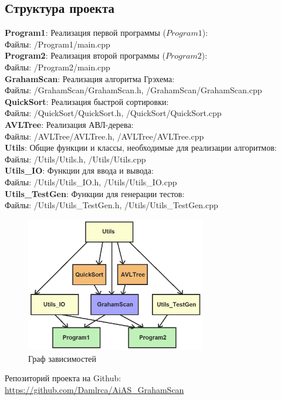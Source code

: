 \subsection{Структура проекта}
\noindent \textbf{Program1}: Реализация первой программы ($Program1$):\\
Файлы: /Program1/main.cpp\\
\noindent \textbf{Program2}: Реализация второй программы ($Program2$):\\
Файлы: /Program2/main.cpp\\
\noindent \textbf{GrahamScan}: Реализация алгоритма Грэхема:\\
Файлы: /GrahamScan/GrahamScan.h, /GrahamScan/GrahamScan.cpp\\
\noindent \textbf{QuickSort}: Реализация быстрой сортировки:\\
Файлы: /QuickSort/QuickSort.h, /QuickSort/QuickSort.cpp\\
\noindent \textbf{AVLTree}: Реализация АВЛ-дерева:\\
Файлы: /AVLTree/AVLTree.h, /AVLTree/AVLTree.cpp\\
\noindent \textbf{Utils}: Общие функции и классы, необходимые для реализации алгоритмов:\\
Файлы: /Utils/Utils.h, /Utils/Utils.cpp\\
\noindent \textbf{Utils\_IO}: Функции для ввода и вывода:\\
Файлы: /Utils/Utils\_IO.h, /Utils/Utils\_IO.cpp\\
\noindent \textbf{Utils\_TestGen}: Функции для генерации тестов:\\
Файлы: /Utils/Utils\_TestGen.h, /Utils/Utils\_TestGen.cpp\\

\begin{figure}[h]
	\centering
	\includegraphics[width=0.7\textwidth]{Images/project_structure.png}
	\caption{Граф зависимостей}
	\label{fig:project_structure}
\end{figure}

\noindent Репозиторий проекта на Github:\\ \url{https://github.com/Damlrca/AiAS_GrahamScan}

\newpage
